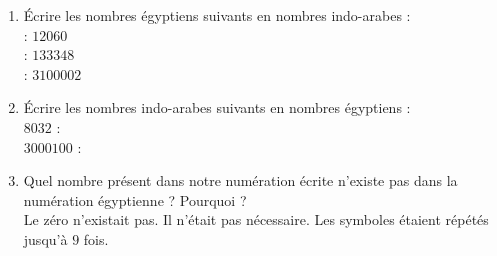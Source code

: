 \begin{corrige}
\begin{enumerate}
     \item Écrire les nombres égyptiens suivants en nombres indo-arabes : \\ [2mm]
     {\Large\textpmhg{\HXthousand\Hthousand\Hthousand\Hten\Hten\Hten\Hten\Hten\Hten}} : {\red $\num{12 060}$} \\ [3mm]
     {\Large\textpmhg{\HCthousand\HXthousand\HXthousand\HXthousand\Hthousand\Hthousand\Hthousand\Hhundred\Hhundred\Hhundred\Hten\Hten\Hten\Hten\Hone\Hone\Hone\Hone\Hone\Hone\Hone\Hone}} : {\red $\num{133 348}$} \\  [3mm]
     {\Large\textpmhg{\Hmillion\Hmillion\Hmillion\HCthousand\Hone\Hone}} : {\red $\num{3 100 002}$} \\
     \item Écrire les nombres indo-arabes suivants en nombres égyptiens : \\ [4mm]
     $\num{8 032}$ : {\red {\Large\textpmhg{\HXthousand\Hthousand\Hthousand\Hthousand\Hthousand\Hthousand\Hthousand\Hthousand\Hten\Hten\Hten\Hone\Hone}}} \\ [5mm]
     $\num{3 000 100}$ :  {\red {\Large\textpmhg{\Hmillion\Hmillion\Hmillion\Hhundred}}} \\
     \item Quel nombre présent dans notre numération écrite n'existe pas dans la numération égyptienne ? Pourquoi ? \\ [3mm]
     
     {\red Le zéro n'existait pas. Il n'était pas nécessaire. Les symboles étaient répétés jusqu'à $9$ fois.}
     \end{enumerate}
\end{corrige}
